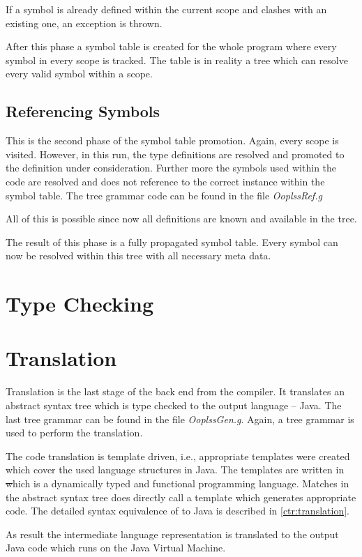 If a symbol is already defined within the current scope and clashes with
an existing one, an exception is thrown.

After this phase a symbol table is created for the whole program where
every symbol in every scope is tracked. The table is in reality a tree
which can resolve every valid symbol within a scope.

\subsection{Referencing Symbols}
This is the second phase of the symbol table promotion. Again, every scope
is visited. However, in this run, the type definitions are resolved and
promoted to the definition under consideration. Further more the symbols
used within the code are resolved and does not reference to the correct
instance within the symbol table. The tree grammar code can be found in
the file \emph{OoplssRef.g}

All of this is possible since now all definitions are known and available
in the tree.

The result of this phase is a fully propagated symbol table. Every symbol can
now be resolved within this tree with all necessary meta data.

\section{Type Checking}

\section{Translation}
Translation is the last stage of the back end from the compiler. It
translates an abstract syntax tree which is type checked to the
output language -- Java. The last tree grammar can be found in the
file \emph{OoplssGen.g}. Again, a tree grammar is used to perform the
translation.

The code translation is template driven, i.e., appropriate templates
were created which cover the used language structures in Java. The
templates are written in \st which is a dynamically typed and functional
programming language. Matches in the abstract syntax tree does directly
call a template which generates appropriate code. The detailed syntax
equivalence of \ooplss to Java is described in \cref{ctr:translation}.

As result the intermediate language representation is translated to the
output Java code which runs on the Java Virtual Machine.

